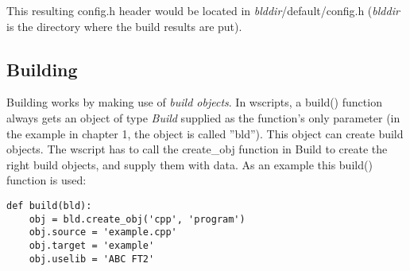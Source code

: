 \documentclass[a4paper,10pt]{article}
\begin{document}
This resulting config.h header would be located in \emph{blddir}/default/config.h (\emph{blddir} is the directory where the build results are put).

\subsection{Building}
Building works by making use of \emph{build objects}. In wscripts, a build() function always gets an object of type \emph{Build} supplied as the function's only parameter (in the example in chapter 1, the object is called ''bld''). This object can create build objects. The wscript has to call the create\_obj function in Build to create the right build objects, and supply them with data. As an example this build() function is used:
\\
\begin{center}
	\begin{lstlisting}[caption=\footnotesize The example build() function]
def build(bld):
    obj = bld.create_obj('cpp', 'program')
    obj.source = 'example.cpp'
    obj.target = 'example'
    obj.uselib = 'ABC FT2'
	\end{lstlisting}
\end{center}
\end{document}
